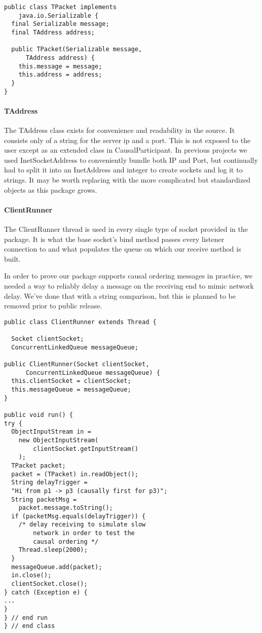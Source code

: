 \documentclass[10pt,journal,compsoc]{IEEEtran}
\begin{document}
\begin{lstlisting}
public class TPacket implements
    java.io.Serializable {
  final Serializable message;
  final TAddress address;

  public TPacket(Serializable message,
      TAddress address) {
    this.message = message;
    this.address = address;
  }
}
\end{lstlisting}

\paragraph{TAddress}
The TAddress class exists for convenience and readability in the source. It consists only of a string for the server ip and a port. This is not exposed to the user except as an extended class in CausalParticipant. In previous projects we used InetSocketAddress to conveniently bundle both IP and Port, but continually had to split it into an InetAddress and integer to create sockets and log it to strings. It may be worth replacing with the more complicated but standardized objects as this package grows.

\paragraph{ClientRunner}
The ClientRunner thread is used in every single type of socket provided in the package. It is what the base socket's bind method passes every listener connection to and what populates the queue on which our receive method is built.

In order to prove our package supports causal ordering messages in practice, we needed a way to reliably delay a message on the receiving end to mimic network delay. We've done that with a string comparison, but this is planned to be removed prior to public release.


\begin{lstlisting}
public class ClientRunner extends Thread {

  Socket clientSocket;
  ConcurrentLinkedQueue messageQueue;

public ClientRunner(Socket clientSocket,
      ConcurrentLinkedQueue messageQueue) {
  this.clientSocket = clientSocket;
  this.messageQueue = messageQueue;
}

public void run() {
try {
  ObjectInputStream in =
    new ObjectInputStream(
        clientSocket.getInputStream()
    );
  TPacket packet;
  packet = (TPacket) in.readObject();
  String delayTrigger =
  "Hi from p1 -> p3 (causally first for p3)";
  String packetMsg =
    packet.message.toString();
  if (packetMsg.equals(delayTrigger)) {
    /* delay receiving to simulate slow
        network in order to test the
        causal ordering */
    Thread.sleep(2000);
  }
  messageQueue.add(packet);
  in.close();
  clientSocket.close();
} catch (Exception e) {
...
}
} // end run
} // end class



\end{lstlisting}
\end{document}
